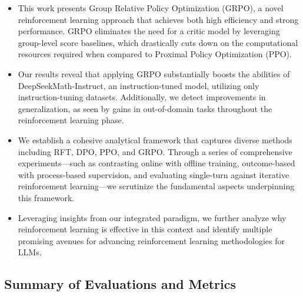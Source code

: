 \begin{itemize}[topsep=0pt]
    \item This work presents Group Relative Policy Optimization (GRPO), a novel reinforcement learning approach that achieves both high efficiency and strong performance. GRPO eliminates the need for a critic model by leveraging group-level score baselines, which drastically cuts down on the computational resources required when compared to Proximal Policy Optimization (PPO).
    \item Our results reveal that applying GRPO substantially boosts the abilities of DeepSeekMath-Instruct, an instruction-tuned model, utilizing only instruction-tuning datasets. Additionally, we detect improvements in generalization, as seen by gains in out-of-domain tasks throughout the reinforcement learning phase.
    \item We establish a cohesive analytical framework that captures diverse methods including RFT, DPO, PPO, and GRPO. Through a series of comprehensive experiments—such as contrasting online with offline training, outcome-based with process-based supervision, and evaluating single-turn against iterative reinforcement learning—we scrutinize the fundamental aspects underpinning this framework.
    \item Leveraging insights from our integrated paradigm, we further analyze why reinforcement learning is effective in this context and identify multiple promising avenues for advancing reinforcement learning methodologies for LLMs.
\end{itemize}

\subsection{Summary of Evaluations and Metrics}

